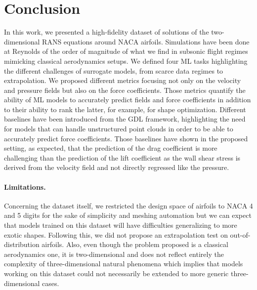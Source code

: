 \section{Conclusion}\label{sec:conclusion}
In this work, we presented a high-fidelity dataset of solutions of the two-dimensional \acrshort{RANS} equations around \acrshort{NACA} airfoils. Simulations have been done at Reynolds of the order of magnitude of what we find in subsonic flight regimes mimicking classical aerodynamics setups. We defined four \acrshort{ML} tasks highlighting the different challenges of surrogate models, from scarce data regimes to extrapolation. We proposed different metrics focusing not only on the velocity and pressure fields but also on the force coefficients. Those metrics quantify the ability of \acrshort{ML} models to accurately predict fields and force coefficients in addition to their ability to rank the latter, for example, for shape optimization. Different baselines have been introduced from the \acrshort{GDL} framework, highlighting the need for models that can handle unstructured point clouds in order to be able to accurately predict force coefficients. Those baselines have shown in the proposed setting, as expected, that the prediction of the drag coefficient is more challenging than the prediction of the lift coefficient as the wall shear stress is derived from the velocity field and not directly regressed like the pressure.

\paragraph{Limitations.} Concerning the dataset itself, we restricted the design space of airfoils to \acrshort{NACA} 4 and 5 digits for the sake of simplicity and meshing automation but we can expect that models trained on this dataset will have difficulties generalizing to more exotic shapes. Following this, we did not propose an extrapolation test on out-of-distribution airfoils. Also, even though the problem proposed is a classical aerodynamics one, it is two-dimensional and does not reflect entirely the complexity of three-dimensional natural phenomena which implies that models working on this dataset could not necessarily be extended to more generic three-dimensional cases.


